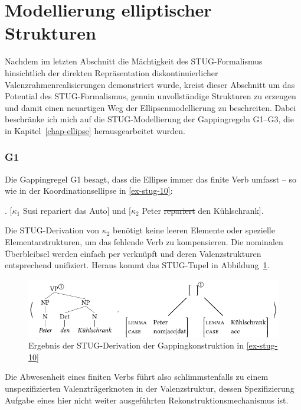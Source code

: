 \section{Modellierung elliptischer Strukturen} \label{sec-stug-ellipse}

Nachdem im letzten Abschnitt die Mächtigkeit des STUG-Formalismus hinsichtlich der direkten Repräsentation diskontinuierlicher Valenzrahmenrealisierungen demonstriert wurde, kreist dieser Abschnitt um das Potential des STUG-Formalismus, genuin unvollständige Strukturen zu erzeugen und damit einen neuartigen Weg der Ellipsenmodellierung zu beschreiten. Dabei beschränke ich mich auf die STUG-Modellierung der Gappingregeln G1--G3, die in Kapitel~\ref{chap-ellipse} herausgearbeitet wurden. 

\subsubsection*{G1}

Die Gappingregel G1 besagt, dass die Ellipse immer das finite Verb umfasst -- so wie in der Koordinationsellipse in \ref{ex-stug-10}:

\ex. \label{ex-stug-10} [$\kappa_1$ Susi repariert das Auto] und [$\kappa_2$ Peter \sout{repariert} den Kühlschrank]. 

Die STUG-Derivation von $\kappa_2$ benötigt keine leeren Elemente oder spezielle Elementarstrukturen, um das fehlende Verb zu kompensieren. Die nominalen Überbleibsel werden einfach per  verknüpft und deren Valenzstrukturen entsprechend unifiziert. Heraus kommt das STUG-Tupel in Abbildung~\ref{fig-stug-14}. 
\begin{figure}[t]
\centering
\includegraphics{graphics/abb914.pdf}
\caption{\label{fig-stug-14} Ergebnis der STUG-Derivation der Gappingkonstruktion in \ref{ex-stug-10}}
\end{figure}
Die Abwesenheit eines finiten Verbs führt also schlimmstenfalls zu einem unspezifizierten Valenzträgerknoten in der Valenzstruktur, dessen Spezifizierung Aufgabe eines hier nicht weiter ausgeführten Rekonstruktionsmechanismus ist. 

